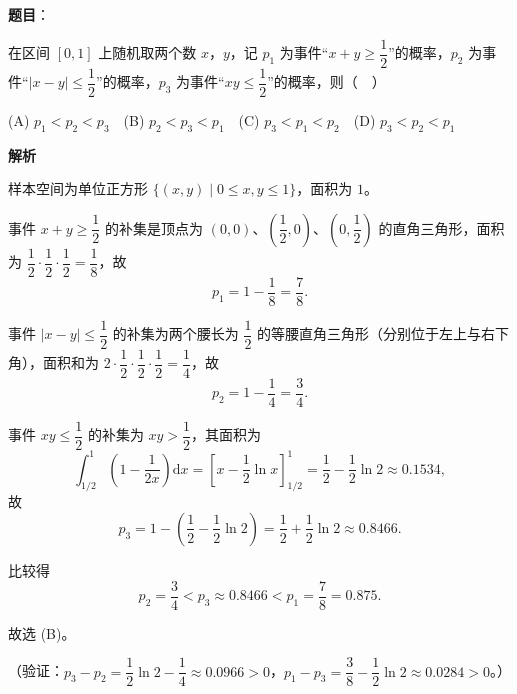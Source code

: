 \begin{answer}

\textbf{题目}：

在区间 \([0,1]\) 上随机取两个数 \(x\)，\(y\)，记 \(p_1\) 为事件“\(x+y\geqslant\dfrac12\)”的概率，\(p_2\) 为事件“\(|x-y|\leqslant\dfrac12\)”的概率，\(p_3\) 为事件“\(xy\leqslant\dfrac12\)”的概率，则（　）

(A) \(p_1<p_2<p_3\)　(B) \(p_2<p_3<p_1\)　(C) \(p_3<p_1<p_2\)　(D) \(p_3<p_2<p_1\)

\textbf{解析}

样本空间为单位正方形 \(\{(x,y)\mid 0\leqslant x,y\leqslant1\}\)，面积为 \(1\)。

事件 \(x+y\geqslant\dfrac12\) 的补集是顶点为 \((0,0)\)、\(\left(\dfrac12,0\right)\)、\(\left(0,\dfrac12\right)\) 的直角三角形，面积为 \(\dfrac12\cdot\dfrac12\cdot\dfrac12=\dfrac18\)，故
\nopagebreak[4]
\[
p_1=1-\dfrac18=\dfrac78.
\]

事件 \(|x-y|\leqslant\dfrac12\) 的补集为两个腰长为 \(\dfrac12\) 的等腰直角三角形（分别位于左上与右下角），面积和为 \(2\cdot\dfrac12\cdot\dfrac12\cdot\dfrac12=\dfrac14\)，故
\nopagebreak[4]
\[
p_2=1-\dfrac14=\dfrac34.
\]

事件 \(xy\leqslant\dfrac12\) 的补集为 \(xy>\dfrac12\)，其面积为
\nopagebreak[4]
\[
\int_{1/2}^{1}\left(1-\dfrac{1}{2x}\right)\mathrm{d}x
=\left[x-\dfrac12\ln x\right]_{1/2}^{1}
=\dfrac12-\dfrac12\ln2\approx0.1534,
\]
故
\nopagebreak[4]
\[
p_3=1-\left(\dfrac12-\dfrac12\ln2\right)=\dfrac12+\dfrac12\ln2\approx0.8466.
\]

比较得
\nopagebreak[4]
\[
p_2=\dfrac34< p_3\approx0.8466< p_1=\dfrac78=0.875.
\]

故选 (B)。

（验证：\(p_3-p_2=\dfrac12\ln2-\dfrac14\approx0.0966>0\)，\(p_1-p_3=\dfrac38-\dfrac12\ln2\approx0.0284>0\)。）


\end{answer}
